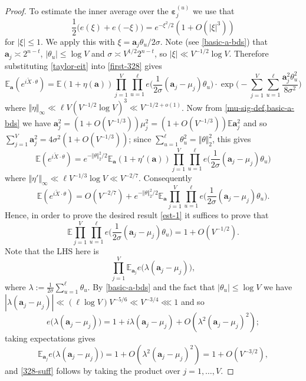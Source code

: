 \documentclass[11pt,reqno]{amsart}
\numberwithin{equation}{section}
\theoremstyle{definition}
\theoremstyle{remark}
\newcommand{\mb}{\mathbb}
\newcommand{\mbf}{\mathbf}
\newcommand{\eps}{\varepsilon}
\def\boldeps{\boldsymbol\eps}
\renewcommand{\le}{\leqslant}
\begin{document}
\begin{proof}
To estimate the inner average over the $\boldeps_j^{(u)}$ we use that 
\begin{equation}\label{taylor-eit} \frac{1}{2}\big(e(\xi)+e(-\xi)\big) = e^{-\xi^2/2} (1 + O(|\xi|^3))\end{equation} for $|\xi| \le 1$. We apply this with $\xi = \mbf{a}_j \theta_u/2\sigma$. Note (see \cref{basic-a-bds}) that $\mbf{a}_j \asymp 2^{n - t}$, $|\theta_u| \le \log V$ and $\sigma \asymp V^{1/2} 2^{n - t}$, so $|\xi| \ll V^{-1/2}\log V$. Therefore substituting \cref{taylor-eit} into \cref{first-328} gives
\[ \mb{E}_{\mbf{a}}(e^{i \tilde X \cdot \theta}) =   \mb{E}(1 + \eta(\mbf{a}))\prod_{j=1}^{V}\prod_{u = 1}^{\ell}  e\big( \frac{1}{2\sigma}  (\mbf{a}_j -\mu_j) \theta_u \big) \cdot \exp\Big(-\sum_{j=1}^{V}\sum_{u=1}^{\ell}\frac{\mbf{a}_j^2\theta_u^2}{8\sigma^2}\Big) \] where $\Vert \eta \Vert_{\infty} \ll \ell V ( V^{-1/2} \log V)^3 \ll V^{-1/2 + o(1)}$. 
Now from \cref{mu-sig-def,basic-a-bds} we have $\mbf{a}_j^2 = (1 + O(V^{-1/3})) \mu_j^2 = (1 + O(V^{-1/3}) )\mb{E} \mbf{a}_j^2$ and so $\sum_{j = 1}^V \mbf{a}_j^2 = 4 \sigma^2 (1 + O(V^{-1/3}))$; since $\sum_{u = 1}^{\ell} \theta_u^2 = \Vert \theta \Vert_2^2$, this gives
\[ \mb{E}(e^{i \tilde X \cdot \theta}) =  e^{-\Vert \theta \Vert_2^2/2}  \mb{E}_{\mbf{a}}(1 + \eta'(\mbf{a}))\prod_{j=1}^{V}\prod_{u = 1}^{\ell}  e\big( \frac{1}{2\sigma}  (\mbf{a}_j -\mu_j) \theta_u \big)  \] where $\Vert \eta' \Vert_{\infty} \ll \ell V^{-1/3}\log V \ll V^{-2/7}$. Consequently
\[ \mb{E}(e^{i \tilde X \cdot \theta}) =  O(V^{-2/7}) + e^{-\Vert \theta \Vert_2^2/2}  \mb{E}_{\mbf{a}}\prod_{j=1}^{V}\prod_{u = 1}^{\ell}  e\big( \frac{1}{2\sigma}  (\mbf{a}_j -\mu_j) \theta_u \big) . \] 
Hence, in order to prove the desired result \cref{est-1} it suffices to prove that 
\begin{equation}\label{328-suff} \mb{E}\prod_{j=1}^{V}\prod_{u = 1}^{\ell}e\big( \frac{1}{2\sigma}  (\mbf{a}_j -\mu_j) \theta_u \big) = 1 + O(V^{-1/2}).\end{equation}
Note that the LHS here is
\[ \prod_{j = 1}^V \mb{E}_{\mbf{a}_j} e\big( \lambda(\mbf{a}_j - \mu_j)\big) , \] where $\lambda := \frac{1}{2\sigma} \sum_{u = 1}^{\ell} \theta_u$. By \cref{basic-a-bds} and the fact that $|\theta_u| \le \log V$ we have $|\lambda (\mbf{a}_j - \mu_j)| \ll (\ell \log V) V^{-5/6} \ll V^{-3/4} \lll 1$ and so  
\[e\big( \lambda(\mbf{a}_j - \mu_j)\big) = 1 + i\lambda (\mbf{a}_j - \mu_j) + O(\lambda^2 (\mbf{a}_j - \mu_j)^2); \] taking expectations gives
\[\mb{E}_{\mbf{a}_j} e\big( \lambda(\mbf{a}_j - \mu_j)\big) = 1  + O(\lambda^2 (\mbf{a}_j - \mu_j)^2) = 1 + O(V^{-3/2}), \] and \cref{328-suff} follows by taking the product over $j = 1,\dots, V$.\vspace*{8pt}


\end{proof}
\end{document}
